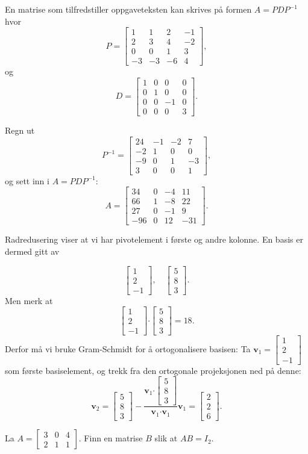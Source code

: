 \documentclass[titlepage,a4paper,12pt,norsk]{IMFeksamen}
\newcommand{\V}[1]{\mathbf{#1}}
\newcommand{\vvv}[3]{\begin{bmatrix} #1 \\ #2 \\ #3 \end{bmatrix}}
\newcommand{\0}{\V{0}}
\begin{document}
\begin{oppgave}
En matrise som tilfredstiller oppgaveteksten kan skrives på formen $A=PDP^{-1}$ hvor
\[
P=\begin{bmatrix}
1  & 1  & 2  & -1 \\
2  & 3  & 4  & -2 \\
0  & 0  & 1  & 3  \\
-3 & -3 & -6 & 4
\end{bmatrix},
\]
og
\[
D=\begin{bmatrix}
1 & 0 & 0  & 0 \\
0 & 1 & 0  & 0 \\
0 & 0 &-1  & 0  \\
0 & 0 & 0  & 3
\end{bmatrix}.
\]

Regn ut
\[
P^{-1}=\begin{bmatrix}
24 & -1 & -2 & 7  \\
-2 & 1  & 0  & 0  \\
-9 & 0  & 1  & -3 \\
3  & 0  & 0  & 1
\end{bmatrix},
\]
og sett inn i $A=PDP^{-1}$:
\[
A=\begin{bmatrix}
34  & 0 & -4 & 11 \\
66  & 1 & -8 & 22 \\
27  & 0 & -1 & 9  \\
-96 & 0 & 12 & -31
\end{bmatrix}.
\]


\end{oppgave}


\begin{oppgave}
Radredusering viser at vi har pivotelement i første og andre kolonne. En basis er dermed gitt av 

$$\vvv{1}{2}{-1}, \quad \vvv{5}{8}{3}.$$
Men merk at 
$$\vvv{1}{2}{-1} \boldsymbol{\cdot} \vvv{5}{8}{3} =18. $$
Derfor må vi bruke Gram-Schmidt for å ortogonalisere basisen:
Ta $\V{v}_1=\vvv{1}{2}{-1}$ som første basiselement, og trekk fra den ortogonale projeksjonen ned på denne:
$$\V{v}_2=\vvv{5}{8}{3}-\frac{\V{v}_1 \boldsymbol{\cdot} \vvv{5}{8}{3}}{\V{v}_1 \boldsymbol{\cdot} \V{v}_1} \V{v}_1=\vvv{2}{2}{6}.$$

\end{oppgave}


\begin{oppgave}
La %
$
A =
\begin{bmatrix}
3 & 0 & 4 \\
2 & 1 & 1
\end{bmatrix}
$.
Finn en matrise $B$ slik at $AB = I_2$.
\end{oppgave}
\end{document}
